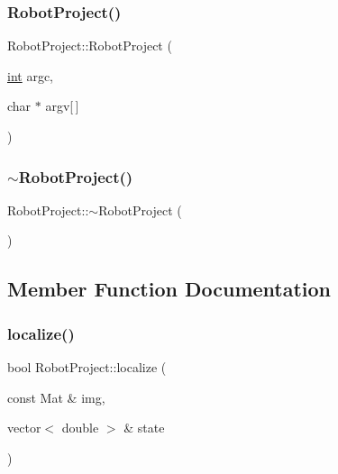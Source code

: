 \mbox{\label{class_robot_project_a12f627710a775cdec8a6416eeaf8db3e}} 
\subsubsection{\texorpdfstring{RobotProject()}{RobotProject()}\hspace{0.1cm}{\footnotesize\ttfamily [2/2]}}
{\footnotesize\ttfamily Robot\+Project\+::\+Robot\+Project (\begin{DoxyParamCaption}\item[{\mbox{\hyperlink{draw_8hh_aa620a13339ac3a1177c86edc549fda9b}{int}}}]{argc,  }\item[{char $\ast$}]{argv\mbox{[}$\,$\mbox{]} }\end{DoxyParamCaption})}

\mbox{\label{class_robot_project_a8510ebe175da3b90ffea7c88b690b4f8}} 
\subsubsection{\texorpdfstring{$\sim$RobotProject()}{~RobotProject()}}
{\footnotesize\ttfamily Robot\+Project\+::$\sim$\+Robot\+Project (\begin{DoxyParamCaption}{ }\end{DoxyParamCaption})}



\subsection{Member Function Documentation}
\mbox{\label{class_robot_project_a9899c66898ccd1b638fe074797a18398}} 
\subsubsection{\texorpdfstring{localize()}{localize()}}
{\footnotesize\ttfamily bool Robot\+Project\+::localize (\begin{DoxyParamCaption}\item[{const Mat \&}]{img,  }\item[{vector$<$ double $>$ \&}]{state }\end{DoxyParamCaption})}

